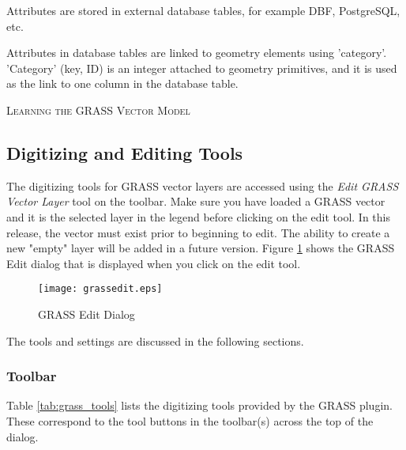 Attributes are stored in external database tables, for example
DBF, PostgreSQL, etc.

Attributes in database tables are linked to geometry elements using
'category'. 'Category' (key, ID) is an
integer attached to geometry primitives, and it is used as the link to one
column in the database table.

\begin{Tip}\caption{\textsc{Learning the GRASS Vector Model}}
\end{Tip} 

\subsection{Digitizing and Editing Tools}
\label{grass_digitising}

The digitizing tools for GRASS vector layers are accessed using the
\textsl{Edit GRASS Vector Layer} tool on the toolbar. Make sure you have
loaded a GRASS vector and it is the selected layer in the legend before
clicking on the edit tool. In this release, the vector must exist prior to
beginning to edit. The ability to create a new "empty" layer will be added in
a future version. Figure \ref{fig:grass_edit} shows the GRASS Edit dialog that
is displayed when you click on the edit tool. 

\begin{figure}[h]
   \begin{center}
   \caption{GRASS Edit Dialog}\label{fig:grass_edit}\smallskip
   \texttt{[image: grassedit.eps]}
\end{center}  
\end{figure}

The tools and settings are discussed in the following sections.

\subsubsection{Toolbar}\label{label_grasstoolbar}

Table \ref{tab:grass_tools} lists the digitizing tools provided by the GRASS
plugin. These correspond to the tool buttons in the toolbar(s) across the top
of the dialog.


